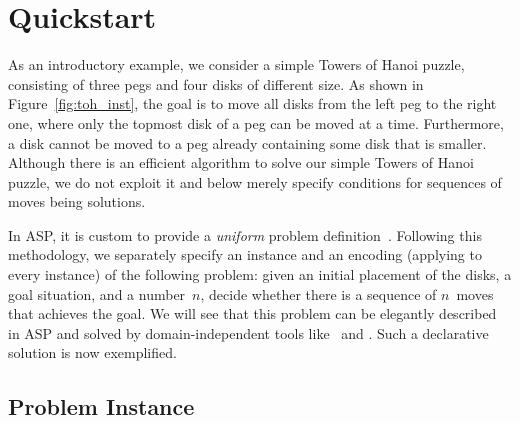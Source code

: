 
\section{Quickstart}\label{sec:quickstart}


As an introductory example,
we consider a simple Towers of Hanoi puzzle,
consisting of three pegs and four disks of different size.
As shown in Figure~\ref{fig:toh_inst},
the goal is to move all disks from the left peg to the right one,
where only the topmost disk of a peg can be moved at a time.
%
Furthermore, 
a disk cannot be moved to a peg already containing some disk that is smaller.
Although there is an efficient algorithm to solve our simple Towers of Hanoi puzzle,
we do not exploit it and below merely specify conditions for
sequences of moves being solutions.

In ASP, it is custom to provide a \emph{uniform}
problem definition~\cite{martru99a,niemela99a,schlipf95a}.
Following this methodology, we separately specify an instance and
an encoding (applying to every instance) of the following problem:
given an initial placement of the disks, a goal situation, and a number~$n$,
decide whether there is a sequence of $n$~moves 
that achieves the goal.
We will see that this problem can be elegantly  
described in ASP and
solved by domain-independent tools like \gringo\ and \clasp.
Such a declarative solution is now exemplified.

\subsection{Problem Instance}

